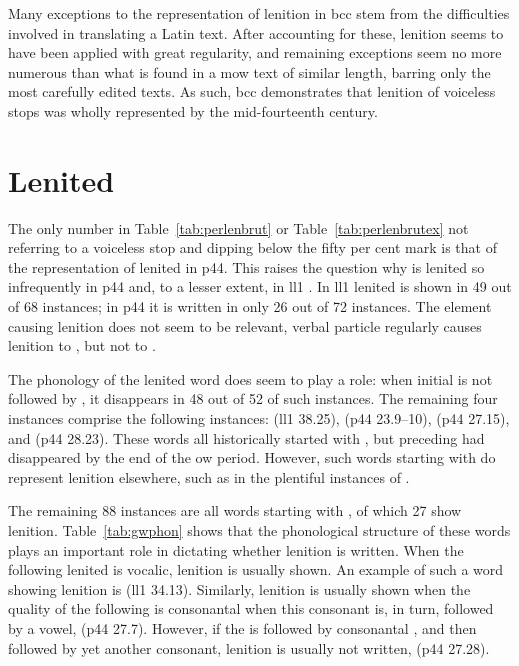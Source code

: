 Many exceptions to the representation of lenition in \gls{bcc} stem from the difficulties involved in translating a Latin text.
After accounting for these, lenition seems to have been applied with great regularity, and remaining exceptions seem no more numerous than what is found in a \gls{mow} text of similar length, barring only the most carefully edited texts.
As such, \gls{bcc} demonstrates that lenition of voiceless stops was wholly represented by the mid-fourteenth century.

\section{Lenited }
\label{sec:lenited-mwg}
The only number in Table~\ref{tab:perlenbrut} or Table~\ref{tab:perlenbrutex} not referring to a voiceless stop and dipping below the fifty per cent mark is that of the representation of lenited  in \gls{p44}.
This raises the question why  is lenited so infrequently in \gls{p44} and, to a lesser
extent, in \gls{ll1} .  In \gls{ll1}
lenited  is shown in 49 out of 68 instances; in \gls{p44} it
is written in  only 26 out of 72 instances.  The element causing lenition
does not seem to be relevant, \eg verbal particle  regularly
causes lenition to , but not to .

The phonology of the lenited word does seem to play a role: when
initial  is not followed by , it disappears in 48 out of
52 of such instances. The remaining four instances comprise the following
instances:  (\gls{ll1} 38.25),
 (\gls{p44} 23.9--10), 
(\gls{p44} 27.15), and  (\gls{p44}
28.23). These words all historically started with , but  \mw{\cw}
preceding  had disappeared by the end of the \gls{ow} period. However, such words
starting with  do represent lenition elsewhere, such as in the
plentiful instances of .

The remaining 88 instances are all words starting with , of which 27 show lenition.
Table~\ref{tab:gwphon} shows that the phonological structure of these words plays an important role in dictating whether lenition is written.
When the  following lenited  is vocalic, lenition is usually shown.
An example of such a word showing lenition is  (\gls{ll1} 34.13).
Similarly, lenition is usually shown when the quality of the following  is consonantal when this consonant is, in turn, followed by a vowel, \eg {} (\gls{p44} 27.7).
However, if the  is followed by consonantal , and then followed by yet another consonant, lenition is usually not written, \eg {} (\gls{p44} 27.28).

